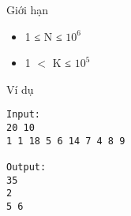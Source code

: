 Giới hạn  
\begin{itemize}
	\item     1 ≤ N ≤ $10^{6}$
	\item     1 $<$ K ≤ $10^{5}$
\end{itemize}
   Ví dụ  
\begin{verbatim}
Input:
20 10
1 1 18 5 6 14 7 4 8 9

Output:
35
2
5 6
\end{verbatim}